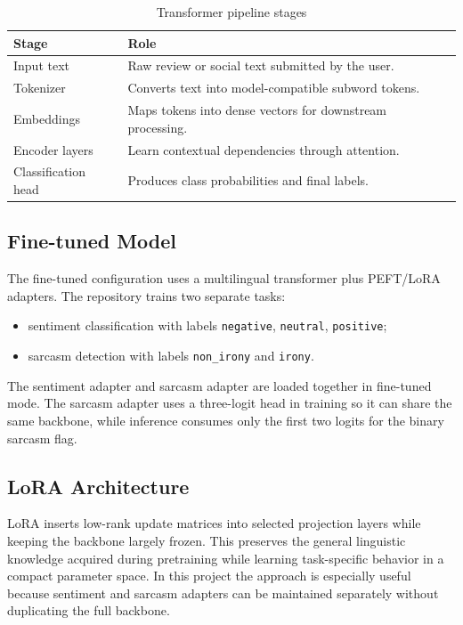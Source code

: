 \documentclass[12pt, a4paper]{article}
\begin{document}
\begin{table}[H]
\centering
\caption{Transformer pipeline stages}
\begin{tabularx}{\textwidth}{@{} p{3.5cm} X @{}}
\toprule
\textbf{Stage} & \textbf{Role} \\
\midrule
Input text & Raw review or social text submitted by the user. \\
Tokenizer & Converts text into model-compatible subword tokens. \\
Embeddings & Maps tokens into dense vectors for downstream processing. \\
Encoder layers & Learn contextual dependencies through attention. \\
Classification head & Produces class probabilities and final labels. \\
\bottomrule
\end{tabularx}
\end{table}

\subsection{Fine-tuned Model}
The fine-tuned configuration uses a multilingual transformer plus PEFT/LoRA adapters. The repository trains two separate tasks:
\begin{itemize}[noitemsep]
  \item sentiment classification with labels \texttt{negative}, \texttt{neutral}, \texttt{positive};
  \item sarcasm detection with labels \texttt{non_irony} and \texttt{irony}.
\end{itemize}
The sentiment adapter and sarcasm adapter are loaded together in fine-tuned mode. The sarcasm adapter uses a three-logit head in training so it can share the same backbone, while inference consumes only the first two logits for the binary sarcasm flag.

\subsection{LoRA Architecture}
LoRA inserts low-rank update matrices into selected projection layers while keeping the backbone largely frozen. This preserves the general linguistic knowledge acquired during pretraining while learning task-specific behavior in a compact parameter space. In this project the approach is especially useful because sentiment and sarcasm adapters can be maintained separately without duplicating the full backbone.
\end{document}
